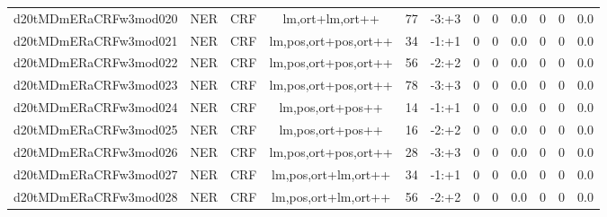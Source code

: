 \documentclass[a4paper]{article}
\begin{document}
\begin{landscape}
\begin{center}
\begin{tabular}{ |c|c|c|c|c|c|c|c|c|c|c|c|}
 
 	
 	\small{ d20tMDmERaCRFw3mod020 } & \small{ NER} & \small{  CRF }  & lm,ort+lm,ort++  &  77 &  \small{  -3:+3 }  &  0 & 0 & 0.0  &  0 & 0 & 0.0 \\
 	

 
 	
 	\small{ d20tMDmERaCRFw3mod021 } & \small{ NER} & \small{  CRF }  & lm,pos,ort+pos,ort++  &  34 &  \small{  -1:+1 }  &  0 & 0 & 0.0  &  0 & 0 & 0.0 \\
 	

 
 	
 	\small{ d20tMDmERaCRFw3mod022 } & \small{ NER} & \small{  CRF }  & lm,pos,ort+pos,ort++  &  56 &  \small{  -2:+2 }  &  0 & 0 & 0.0  &  0 & 0 & 0.0 \\
 	

 
 	
 	\small{ d20tMDmERaCRFw3mod023 } & \small{ NER} & \small{  CRF }  & lm,pos,ort+pos,ort++  &  78 &  \small{  -3:+3 }  &  0 & 0 & 0.0  &  0 & 0 & 0.0 \\
 	

 
 	
 	\small{ d20tMDmERaCRFw3mod024 } & \small{ NER} & \small{  CRF }  & lm,pos,ort+pos++  &  14 &  \small{  -1:+1 }  &  0 & 0 & 0.0  &  0 & 0 & 0.0 \\
 	

 
 	
 	\small{ d20tMDmERaCRFw3mod025 } & \small{ NER} & \small{  CRF }  & lm,pos,ort+pos++  &  16 &  \small{  -2:+2 }  &  0 & 0 & 0.0  &  0 & 0 & 0.0 \\
 	

 
 	
 	\small{ d20tMDmERaCRFw3mod026 } & \small{ NER} & \small{  CRF }  & lm,pos,ort+pos,ort++  &  28 &  \small{  -3:+3 }  &  0 & 0 & 0.0  &  0 & 0 & 0.0 \\
 	

 
 	
 	\small{ d20tMDmERaCRFw3mod027 } & \small{ NER} & \small{  CRF }  & lm,pos,ort+lm,ort++  &  34 &  \small{  -1:+1 }  &  0 & 0 & 0.0  &  0 & 0 & 0.0 \\
 	

 
 	
 	\small{ d20tMDmERaCRFw3mod028 } & \small{ NER} & \small{  CRF }  & lm,pos,ort+lm,ort++  &  56 &  \small{  -2:+2 }  &  0 & 0 & 0.0  &  0 & 0 & 0.0 \\
 	
 \hline
\end{tabular}
\end{center}





\end{landscape}
\end{document}
